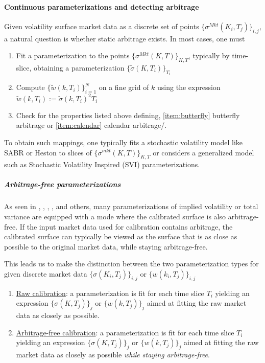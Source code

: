 \documentclass[11pt,letterpaper]{article}
\begin{document}
\paragraph{Continuous parameterizations and detecting arbitrage}

Given volatility surface market data as a discrete set of points $\{ \sigma^{Mkt}(K_i,T_j) \}_{i,j}$, a natural question is whether static arbitrage exists. In most cases, one must 
\begin{enumerate}
\item Fit a parameterization to the points $\{ \sigma^{Mkt}(K,T) \}_{K,T}$, typically by time-slice, obtaining a parameterization $\{ \widetilde{\sigma}(K,T_i)   \}_{T_i} $
\item Compute $\{ \widetilde{w}(k,T_i) \}_{i=1}^N$ on a fine grid of $k$ using the expression $\widetilde{w}(k,T_i) := \widetilde{\sigma}(k,T_i)^2 T_i$   
\item Check for the properties listed above defining, \ref{item:butterfly} butterfly arbitrage or  \ref{item:calendar} calendar arbitrage/.
\end{enumerate}
To obtain such mappings, one typically fits a stochastic volatility model like SABR or Heston to slices of $\{\sigma^{mkt}(K,T)\}_{K,T}$ or considers a generalized model such as Stochastic Volatility Inspired (SVI) parameterizations. 

\subparagraph{Arbitrage-free parameterizations} 

As seen in \cite{gatheral2004parsimonious}, \cite{gatheral2014arbitrage}, \cite{hendriks2017extended}, \cite{corbetta2019robust}, and others, many parameterizations of implied volatility or total variance are equipped with a mode where the calibrated surface is also arbitrage-free. If the input market data used for calibration contains arbitrage, the calibrated surface can typically be viewed as the surface that is as close as possible to the original market data, while staying arbitrage-free. 

This leads us to make the distinction between the two parameterization types for given discrete market data $\{ \sigma(K_i,T_j) \}_{i,j}$ or $\{ w(k_i,T_j) \}_{i,j}$  
\begin{enumerate}
\item \underline{Raw calibration}: a parameterization is fit for each time slice $T_i$ yielding an expression $\{ \sigma(K,T_j) \}_{j}$ or $\{ w(k,T_j) \}_{j}$ aimed at fitting the raw market data as closely as possible. 
\item \underline{Arbitrage-free calibration}: a parameterization is fit for each time slice $T_i$ yielding an expression $\{ \sigma(K,T_j) \}_{j}$ or $\{ w(k,T_j) \}_{j}$ aimed at fitting the raw market data as closely as possible \textit{while staying arbitrage-free}. 
\end{enumerate}
\end{document}
